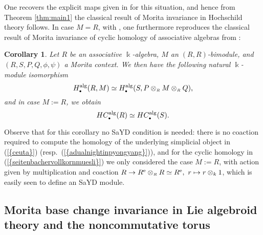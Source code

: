 \documentclass[reqno, a4paper, 10pt]{amsart}
\numberwithin{equation}{section}
\theoremstyle{plain}
\newtheorem{cor}[theorem]{Corollary}
\theoremstyle{definition}
\theoremstyle{remark}
\begin{document}
One recovers the explicit maps given in \cite{McC:MEACH} for this situation, and hence from Theorem \ref{thm:main1} the classical result \cite{McC:MEACH, DenIgu:HHATSOFP} 
of Morita invariance in Hochschild theory follows. In case $M = R$, with \cite[Prop.~3.1]{KowPos:TCTOHA}, one furthermore 
reproduces the classical result of Morita invariance of cyclic homology of associative algebras from \cite{Con:NCDG, LodQui:CHATLAHOM,McC:MEACH}:
\begin{cor}
\label{cor:alg}
Let $R$ be an associative $\Bbbk$-algebra, 
$M$ an $(R,R)$-bimodule, and $(R,S,P,Q,\phi,\psi)$ a Morita context. 
We then have the following natural $\Bbbk$-module isomorphism
$$
H^{\rm alg}_{{\scriptscriptstyle{\bullet}}}(R, M) \simeq H^{\rm alg}_{{\scriptscriptstyle{\bullet}}}(S, P \otimes_{{\scriptscriptstyle{R}}} M \otimes_{{\scriptscriptstyle{R}}} Q), 
$$ 
and in case $M:=R$, we obtain
\begin{equation}
\label{seitenbachervollkornmuesli}
HC^{\rm alg}_{{\scriptscriptstyle{\bullet}}}(R) \simeq HC^{\rm alg}_{{\scriptscriptstyle{\bullet}}}(S). 
\end{equation}
\end{cor}
Observe that for this corollary no SaYD condition is needed: there is no coaction required to compute the homology of the underlying simplicial object in {{\rm (}\ref{{ceuta}}{\rm )}} (resp.~{{\rm (}\ref{{adualnightinpyongyang}}{\rm )}}), and for the cyclic homology in {{\rm (}\ref{{seitenbachervollkornmuesli}}{\rm )}} we only considered the case $M:=R$, with action given by multiplication and coaction $R \to {{R^{\rm e}}} \otimes_{{\scriptscriptstyle{R}}} R \simeq {{R^{\rm e}}}, \ r \mapsto r \otimes_k 1$, which is easily seen to define an SaYD module.

\subsection{Morita base change invariance in Lie algebroid theory and the noncommutative torus} 
\end{document}
